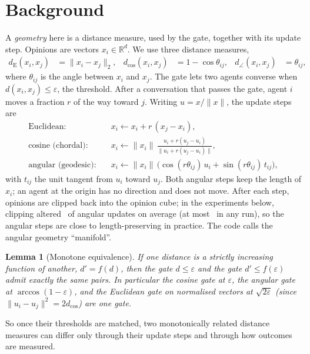 \documentclass[11pt]{article}
\newtheorem{lemma}{Lemma}
\begin{document}
\section{Background}
\label{sec:background}

A \emph{geometry} here is a distance measure, used by the gate, together with its update step.
Opinions are vectors $x_i \in \mathbb{R}^d$.
We use three distance measures,
\begin{align*}
d_{\mathrm{E}}(x_i,x_j) &= \lVert x_i - x_j \rVert_2, &
d_{\cos}(x_i,x_j) &= 1 - \cos\theta_{ij}, &
d_\angle(x_i,x_j) &= \theta_{ij},
\end{align*}
where $\theta_{ij}$ is the angle between $x_i$ and $x_j$.
The gate lets two agents converse when $d(x_i,x_j) \le \varepsilon$, the threshold.
After a conversation that passes the gate, agent $i$ moves a fraction $r$ of the way toward $j$.
Writing $u = x/\lVert x\rVert$, the update steps are
\begin{align*}
\text{Euclidean:}\quad & x_i \leftarrow x_i + r\,(x_j - x_i),\\
\text{cosine (chordal):}\quad & x_i \leftarrow \lVert x_i\rVert\,\frac{u_i + r(u_j - u_i)}{\lVert u_i + r(u_j - u_i)\rVert},\\
\text{angular (geodesic):}\quad & x_i \leftarrow \lVert x_i\rVert\,\bigl(\cos(r\theta_{ij})\,u_i + \sin(r\theta_{ij})\,t_{ij}\bigr),
\end{align*}
with $t_{ij}$ the unit tangent from $u_i$ toward $u_j$.
Both angular steps keep the length of $x_i$; an agent at the origin has no direction and does not move.
After each step, opinions are clipped back into the opinion cube; in the experiments below, clipping altered \VClipMean\ of angular updates on average (at most \VClipMax\ in any run), so the angular steps are close to length-preserving in practice.
The code calls the angular geometry ``manifold''.

\begin{lemma}[Monotone equivalence]
\label{lem:monotone}
If one distance is a strictly increasing function of another, $d' = f(d)$, then the gate $d \le \varepsilon$ and the gate $d' \le f(\varepsilon)$ admit exactly the same pairs.
In particular the cosine gate at $\varepsilon$, the angular gate at $\arccos(1-\varepsilon)$, and the Euclidean gate on normalised vectors at $\sqrt{2\varepsilon}$ (since $\lVert u_i - u_j\rVert^2 = 2 d_{\cos}$) are one gate.
\end{lemma}
\noindent So once their thresholds are matched, two monotonically related distance measures can differ only through their update steps and through how outcomes are measured.
\end{document}
